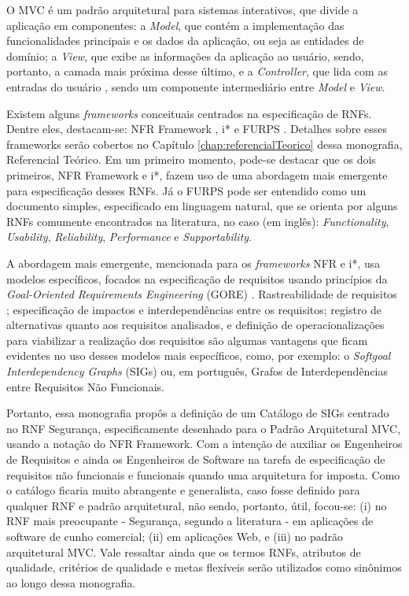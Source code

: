O MVC é um padrão arquitetural para sistemas interativos, que divide a aplicação em componentes: a \textit{Model}, que contém a implementação das funcionalidades principais e os dados da aplicação, ou seja as entidades de domínio; a \textit{View}, que exibe as informações da aplicação ao usuário, sendo, portanto, a camada mais próxima desse último, e a \textit{Controller}, que lida com as entradas do usuário \cite{buschmann1996system}, sendo um componente intermediário entre \textit{Model} e \textit{View}.  

Existem alguns \textit{frameworks} conceituais centrados na especificação de RNFs. Dentre eles, destacam-se: NFR Framework \cite{chung2009non}, i* \cite{istarwiki20} e FURPS \cite{umar2011analyzing}. Detalhes sobre esses frameworks serão cobertos no Capítulo \ref{chap:referencialTeorico} dessa monografia, Referencial Teórico. Em um primeiro momento, pode-se destacar que os dois primeiros, NFR Framework e i*, fazem uso de uma abordagem mais emergente para especificação desses RNFs. Já o FURPS pode ser entendido como um documento simples, especificado em linguagem natural, que se orienta por alguns RNFs comumente encontrados na literatura, no caso (em inglês): \textit{Functionality}, \textit{Usability}, \textit{Reliability}, \textit{Performance} e \textit{Supportability}.

A abordagem mais emergente, mencionada para os \textit{frameworks} NFR e i*, usa modelos específicos, focados na especificação de requisitos usando princípios da \textit{Goal-Oriented Requirements Engineering} (GORE) \cite{horkoff2016goal}. Rastreabilidade de requisitos \cite{wiegers2013software}; especificação de impactos e interdependências entre os requisitos; registro de alternativas quanto aos requisitos analisados, e definição de operacionalizações para viabilizar a realização dos requisitos são algumas vantagens que ficam evidentes no uso desses modelos mais específicos, como, por exemplo: o \textit{Softgoal Interdependency Graphs} (SIGs) \cite{chung2012non} ou, em português, Grafos de Interdependências entre Requisitos Não Funcionais. 

Portanto, essa monografia propôs a definição de um Catálogo de SIGs centrado no RNF Segurança, especificamente desenhado para o Padrão Arquitetural MVC, usando a notação do NFR Framework. Com a intenção de auxiliar os Engenheiros de Requisitos e ainda os Engenheiros de Software na tarefa de especificação de requisitos não funcionais e funcionais quando uma arquitetura for imposta. Como o catálogo ficaria muito abrangente e generalista, caso fosse definido para qualquer RNF e padrão arquitetural, não sendo, portanto, útil, focou-se: (i) no RNF mais preocupante - Segurança, segundo a literatura - em aplicações de software de cunho comercial; (ii) em aplicações Web, e (iii) no padrão arquitetural MVC.  Vale ressaltar ainda que os termos RNFs, atributos de qualidade, critérios de qualidade e metas flexíveis serão utilizados como sinônimos ao longo dessa monografia.


